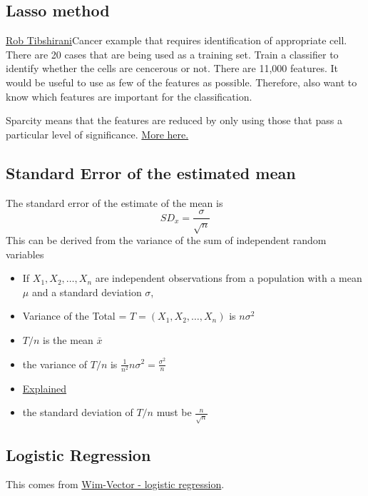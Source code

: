 \documentclass[12pt, a4paper, oneside]{article}\usepackage{graphicx, color}
\begin{document}
\subsection{Lasso method}
\href{http://www.mathtube.org/lecture/video/lasso-brief-review-and-new-significance-test#.U1aODV1sp94.twitter}{Rob Tibshirani}Cancer example that requires identification of appropriate cell. There are 20 cases that are being used as a training set.  Train a classifier to identify whether the cells are cencerous or not.  There are 11,000 features. It would be useful to use as few of the features as possible. Therefore, also want to know which features are important for the classification. 

Sparcity means that the features are reduced by only using those that pass a particular level of significance.  \href{http://statweb.stanford.edu/~tibs/lasso.html}{More here.}

\subsection{Standard Error of the estimated mean}
The standard error of the estimate of the mean is 
\begin{equation}
SD_x = \frac{\sigma}{\sqrt{n}}
\end{equation}
This can be derived from the variance of the sum of independent random variables
\begin{itemize}
\item If $X_1, X_2, \dots, X_n$ are independent observations from a population with a mean $\mu$ and a standard deviation $\sigma$, 
\item Variance of the Total = $T = (X_1, X_2, \dots, X_n)$ is $n\sigma^2$
\item $T/n$ is the mean $\bar{x}$
\item the variance of $T/n$ is $\frac{1}{n^2}n\sigma^2 = \frac{\sigma^2}{n}$
\item \href{https://onlinecourses.science.psu.edu/stat414/node/167}{Explained}
\item the standard deviation of $T/n$ must be $\frac{n}{\sqrt{n}}$
\end{itemize}

\subsection{Logistic Regression}
This comes from \href{http://www.win-vector.com/blog/2010/11/learn-a-powerful-machine-learning-tool-logistic-regression-and-beyond/}{Wim-Vector - logistic regression}.  
\end{document}
